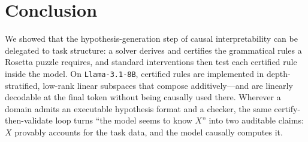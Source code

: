 \section{Conclusion}
\label{sec:conclusion}

We showed that the hypothesis-generation step of causal interpretability
can be delegated to task structure: a solver derives and certifies the
grammatical rules a Rosetta puzzle requires, and standard interventions
then test each certified rule inside the model. On
\texttt{Llama-3.1-8B}, certified rules are implemented in depth-stratified,
low-rank linear subspaces that compose additively---and are linearly
decodable at the final token without being causally used there. Wherever a
domain admits an executable hypothesis format and a checker, the same
certify-then-validate loop turns ``the model seems to know $X$'' into two
auditable claims: $X$ provably accounts for the task data, and the model
causally computes it.
